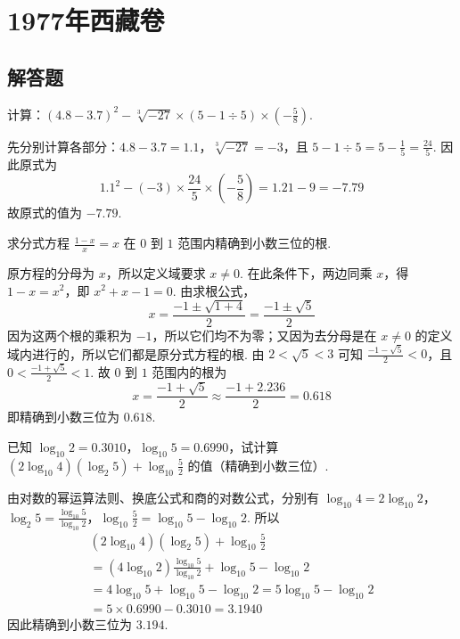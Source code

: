 \chapter{1977年西藏卷}

\section{解答题}

\begin{problem}
计算：\(\left(4.8-3.7\right)^2-\sqrt[3]{-27}\times\left(5-1\div5\right)\times\left(-\frac{5}{8}\right)\).
\end{problem}

\begin{solution}
先分别计算各部分：\(4.8-3.7=1.1\)，\(\sqrt[3]{-27}=-3\)，且 \(5-1\div5=5-\frac{1}{5}=\frac{24}{5}\). 因此原式为
\[
1.1^2-\left(-3\right)\times\frac{24}{5}\times\left(-\frac{5}{8}\right)=1.21-9=-7.79
\]
故原式的值为 \(-7.79\).
\end{solution}

\begin{problem}
求分式方程 \(\frac{1-x}{x}=x\) 在 \(0\) 到 \(1\) 范围内精确到小数三位的根.
\end{problem}

\begin{solution}
原方程的分母为 \(x\)，所以定义域要求 \(x\ne0\). 在此条件下，两边同乘 \(x\)，得 \(1-x=x^2\)，即 \(x^2+x-1=0\). 由求根公式，
\[
x=\frac{-1\pm\sqrt{1+4}}{2}=\frac{-1\pm\sqrt{5}}{2}
\]
因为这两个根的乘积为 \(-1\)，所以它们均不为零；又因为去分母是在 \(x\ne0\) 的定义域内进行的，所以它们都是原分式方程的根. 由 \(2<\sqrt{5}<3\) 可知 \(\frac{-1-\sqrt{5}}{2}<0\)，且 \(0<\frac{-1+\sqrt{5}}{2}<1\).
故 \(0\) 到 \(1\) 范围内的根为
\[
x=\frac{-1+\sqrt{5}}{2}\approx\frac{-1+2.236}{2}=0.618
\]
即精确到小数三位为 \(0.618\).
\end{solution}

\begin{problem}
已知 \(\log_{10}2=0.3010\)，\(\log_{10}5=0.6990\)，试计算 \(\left(2\log_{10}4\right)\left(\log_2 5\right)+\log_{10}\frac{5}{2}\) 的值（精确到小数三位）.
\end{problem}

\begin{solution}
由对数的幂运算法则、换底公式和商的对数公式，分别有 \(\log_{10}4=2\log_{10}2\)，\(\log_2 5=\frac{\log_{10}5}{\log_{10}2}\)，\(\log_{10}\frac{5}{2}=\log_{10}5-\log_{10}2\). 所以
\[
\begin{gathered}
\left(2\log_{10}4\right)\left(\log_2 5\right)+\log_{10}\frac{5}{2}\\
=\left(4\log_{10}2\right)\frac{\log_{10}5}{\log_{10}2}+\log_{10}5-\log_{10}2\\
=4\log_{10}5+\log_{10}5-\log_{10}2=5\log_{10}5-\log_{10}2\\
=5\times0.6990-0.3010=3.1940
\end{gathered}
\]
因此精确到小数三位为 \(3.194\).
\end{solution}

